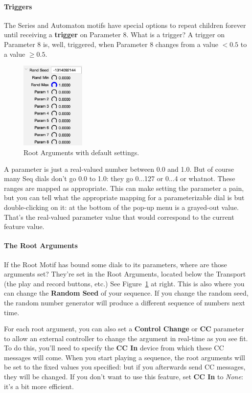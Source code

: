 \documentclass[twoside,10pt]{article}
\begin{document}
\paragraph{Triggers} The Series and Automaton motifs have special options to repeat children forever until receiving a {\bf trigger} on Parameter 8.  What is a trigger?  A trigger on Parameter 8 is, well, triggered, when Parameter 8 changes from a value \(< 0.5\) to a value \(\geq 0.5\). 


\begin{figure}
\vspace{-1em}
\includegraphics[width=1.25in]{rootarguments}
\caption{Root Arguments with default settings.}
\vspace{-4em}
\label{rootarguments}
\end{figure}

A parameter is just a real-valued number between 0.0 and 1.0.  But of course many Seq dials don't go 0.0 to 1.0: they go 0...127 or 0...4 or whatnot.  These ranges are mapped  as appropriate.  This can make setting the parameter a pain, but you can tell what the appropriate mapping for a parameterizable dial is but double-clicking on it: at the bottom of the pop-up menu is a grayed-out value. That's the real-valued parameter value that would correspond to the current feature value.    


\paragraph{The Root Arguments}  If the Root Motif has bound some dials to its parameters, where are those arguments set?  They're set in the Root Arguments, located below the Transport (the play and record buttons, etc.)  See Figure~\ref{rootarguments} at right.  This is also where you can change the {\bf Random Seed} of your sequence.  If you change the random seed, the random number generator will produce a different sequence of numbers next time.

For each root argument, you can also set a {\bf Control Change} or {\bf CC} parameter to allow an external controller to change the argument in real-time as you see fit.  To do this, you'll need to specify the {\bf CC In} device from which these CC messages will come.  When you start playing a sequence, the root arguments will be set to the fixed values you specified: but if you afterwards send CC messages, they will be changed.  If you don't want to use this feature, set  {\bf CC In} to {\it None}: it's a bit more efficient.
\end{document}
